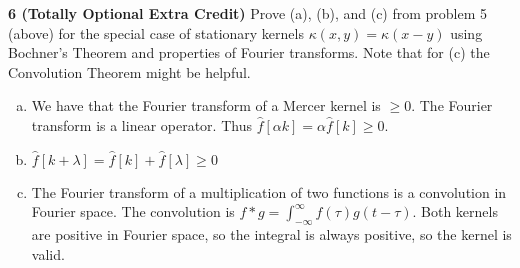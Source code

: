 \documentclass[12pt,letterpaper,fleqn]{hmcpset}
\begin{document}
\newpage

\textbf{6 (Totally Optional Extra Credit)} Prove (a), (b), and (c) from problem 5 (above) for the special
case of stationary kernels $\kappa(x,y) = \kappa(x-y)$ using Bochner's Theorem and properties of
Fourier transforms. Note that for (c) the Convolution Theorem might be helpful.

\vspace{12mm}

\begin{enumerate}[(a)]
    \item 
        We have that the Fourier transform of a Mercer kernel is $\geq 0$. The Fourier transform is a linear operator. Thus $\hat{f}[\alpha k] = \alpha \hat{f}[k] \geq 0$.
    \item
        $\hat{f}[k + \lambda] = \hat{f}[k] + \hat{f}[\lambda] \geq 0$
    \item
        The Fourier transform of a multiplication of two functions is a convolution in Fourier space. The convolution is $f * g = \int_{-\infty}^{\infty} f(\tau)g(t-\tau)$. Both kernels are positive in Fourier space, so the integral is always positive, so the kernel is valid.

\end{enumerate}
\end{document}
